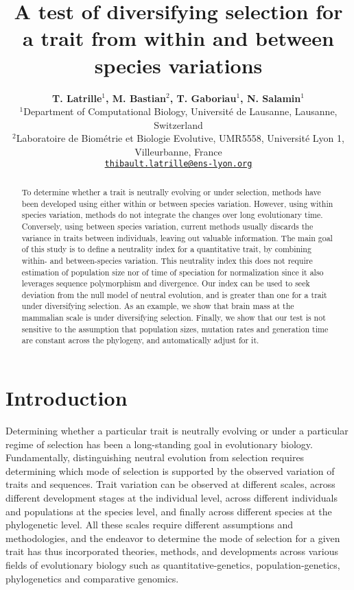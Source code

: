 \documentclass{article}
\title{A test of diversifying selection for a trait from within and between species variations}
\author{
\large
\textbf{T. {Latrille}$^{1}$\orcidlink{0000-0002-9643-4668}, M. {Bastian}$^{2}$, T. {Gaboriau}$^{1}$\orcidlink{0000-0001-7530-2204}, N. {Salamin}$^{1}$\orcidlink{0000-0002-3963-4954}}\\
\normalsize
$^{1}$Department of Computational Biology, Université de Lausanne, Lausanne, Switzerland\\
$^{2}$Laboratoire de Biométrie et Biologie Evolutive, UMR5558, Université Lyon 1, Villeurbanne, France \\
\texttt{\href{mailto:thibault.latrille@ens-lyon.org}{thibault.latrille@ens-lyon.org}} \\
}
\begin{document}
\maketitle

\begin{abstract}
    To determine whether a trait is neutrally evolving or under selection, methods have been developed using either within or between species variation.
    However, using within species variation, methods do not integrate the changes over long evolutionary time.
    Conversely, using between species variation, current methods usually discards the variance in traits between individuals, leaving out valuable information.
    The main goal of this study is to define a neutrality index for a quantitative trait, by combining within- and between-species variation.
    This neutrality index this does not require estimation of population size nor of time of speciation for normalization since it also leverages sequence polymorphism and divergence.
    Our index can be used to seek deviation from the null model of neutral evolution, and is greater than one for a trait under diversifying selection.
    As an example, we show that brain mass at the mammalian scale is under diversifying selection.
    Finally, we show that our test is not sensitive to the assumption that population sizes, mutation rates and generation time are constant across the phylogeny, and automatically adjust for it.
\end{abstract}


\section{Introduction}\label{sec:introduction}

Determining whether a particular trait is neutrally evolving or under a particular regime of selection has been a long-standing goal in evolutionary biology.
Fundamentally, distinguishing neutral evolution from selection requires determining which mode of selection is supported by the observed variation of traits and sequences.
Trait variation can be observed at different scales, across different development stages at the individual level, across different individuals and populations at the species level, and finally across different species at the phylogenetic level.
All these scales require different assumptions and methodologies, and the endeavor to determine the mode of selection for a given trait has thus incorporated theories, methods, and developments across various fields of evolutionary biology such as quantitative-genetics, population-genetics, phylogenetics and comparative genomics\cite{lynch_genetics_1998, walsh_evolution_2018}.
\end{document}
